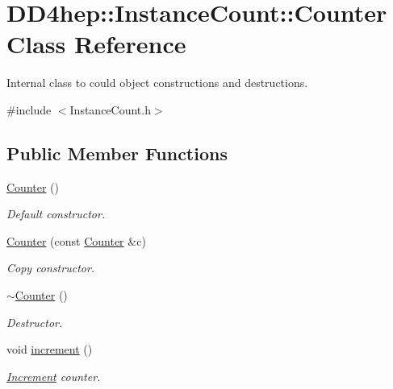 \hypertarget{class_d_d4hep_1_1_instance_count_1_1_counter}{
\section{DD4hep::InstanceCount::Counter Class Reference}
\label{class_d_d4hep_1_1_instance_count_1_1_counter}
}


Internal class to could object constructions and destructions.  


{\ttfamily \#include $<$InstanceCount.h$>$}\subsection*{Public Member Functions}
\begin{DoxyCompactItemize}
\item 
\hyperlink{class_d_d4hep_1_1_instance_count_1_1_counter_a80741252e730cdf0cb149b77578168a0}{Counter} ()
\begin{DoxyCompactList}\small\item\em Default constructor. \item\end{DoxyCompactList}\item 
\hyperlink{class_d_d4hep_1_1_instance_count_1_1_counter_aa8a1753db486e2ebee02236dee29ec66}{Counter} (const \hyperlink{class_d_d4hep_1_1_instance_count_1_1_counter}{Counter} \&c)
\begin{DoxyCompactList}\small\item\em Copy constructor. \item\end{DoxyCompactList}\item 
\hyperlink{class_d_d4hep_1_1_instance_count_1_1_counter_a6bd715538db93a8e4b4f9a27c4b0c793}{$\sim$Counter} ()
\begin{DoxyCompactList}\small\item\em Destructor. \item\end{DoxyCompactList}\item 
void \hyperlink{class_d_d4hep_1_1_instance_count_1_1_counter_aa127bfbbe011428fcbbeeaa7dfd25e1e}{increment} ()
\begin{DoxyCompactList}\small\item\em \hyperlink{struct_d_d4hep_1_1_increment}{Increment} counter. \item\end{DoxyCompactList}\item 

\end{DoxyCompactItemize}
